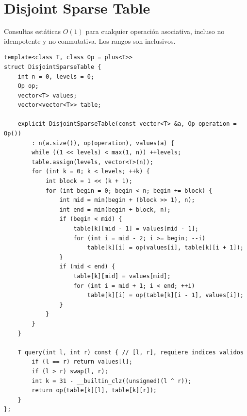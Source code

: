 \section{Disjoint Sparse Table}

Consultas est\'aticas $O(1)$ para cualquier operaci\'on asociativa, incluso no
idempotente y no conmutativa. Los rangos son inclusivos.


\begin{lstlisting}[style=cpp]
template<class T, class Op = plus<T>>
struct DisjointSparseTable {
    int n = 0, levels = 0;
    Op op;
    vector<T> values;
    vector<vector<T>> table;

    explicit DisjointSparseTable(const vector<T> &a, Op operation = Op())
        : n(a.size()), op(operation), values(a) {
        while ((1 << levels) < max(1, n)) ++levels;
        table.assign(levels, vector<T>(n));
        for (int k = 0; k < levels; ++k) {
            int block = 1 << (k + 1);
            for (int begin = 0; begin < n; begin += block) {
                int mid = min(begin + (block >> 1), n);
                int end = min(begin + block, n);
                if (begin < mid) {
                    table[k][mid - 1] = values[mid - 1];
                    for (int i = mid - 2; i >= begin; --i)
                        table[k][i] = op(values[i], table[k][i + 1]);
                }
                if (mid < end) {
                    table[k][mid] = values[mid];
                    for (int i = mid + 1; i < end; ++i)
                        table[k][i] = op(table[k][i - 1], values[i]);
                }
            }
        }
    }

    T query(int l, int r) const { // [l, r], requiere indices validos
        if (l == r) return values[l];
        if (l > r) swap(l, r);
        int k = 31 - __builtin_clz((unsigned)(l ^ r));
        return op(table[k][l], table[k][r]);
    }
};
\end{lstlisting}

